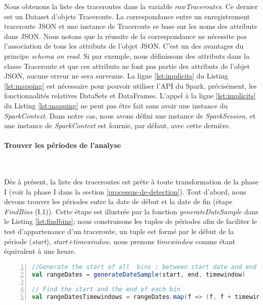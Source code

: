 Nous obtenons la liste des traceroutes dans la variable \textit{rawTraceroutes}. Ce dernier est un Dataset d'objets  Traceroute.
La correspondance entre un enregistrement traceroute JSON et une instance de Traceroute se base sur les noms des attributs dans JSON.
Nous notons que la réussite de la correspondance ne nécessite pas l'association de tous les attributs de l'objet JSON. C'est un des avantages du principe \textit{schema on read}.  Si par exemple, nous définissons des attributs dans la classe Traceroute et que ces attributs ne font pas partie des attributs de l'objet JSON, aucune erreur ne sera survenue.  
La ligne \ref{lst:implicits} du Listing \ref{lst:mapping}  est nécessaire  pour pouvoir utiliser  l'API du Spark, précisément,  les fonctionnalités relatives DataSets et DataFrames. L'appel à la ligne \ref{lst:implicits} du Listing \ref{lst:mapping} ne peut pas être fait sans avoir une instance du \textit{SparkContext}. Dans notre cas, nous avons défini une instance de \textit{SparkSession}, et une instance  de \textit{SparkContext} est fournie, par défaut,  avec cette dernière.



\paragraph{Trouver les périodes de l'analyse}~

Dès à présent, la liste des traceroutes est prête à toute transformation de la phase I (voir la phase I dans la section \ref{processus-de-detection}). 
Tout d'abord, nous devons trouver les périodes entre la date de début et la date de fin (étape \textit{FindBins} (I.1)). 
Cette étape est illustrée par la fonction \textit{generateDateSample}  dans le Listing \ref{lst:findbins};  
 nous construisons les tuples de périodes afin de faciliter le test d'appartenance d'un traceroute, un tuple est formé par le début de la période (\textit{start}),  \textit{start+timewindow}, nous prenons \textit{timewindow} comme étant  équivalent à une heure.


\begin{lstlisting}[language=scala,firstnumber=1, caption={Etape FindBins (I.1)},label={lst:findbins}, basicstyle = \small,escapechar=|,numbers=left,
stepnumber=1]
//Generate the start of all  bins : between start date and end date espaced by the timewindow
val rangeDates = generateDateSample(start, end, timewindow)

// Find the start and the end of each bin
val rangeDatesTimewindows = rangeDates.map(f => (f, f + timewindow))
\end{lstlisting}

